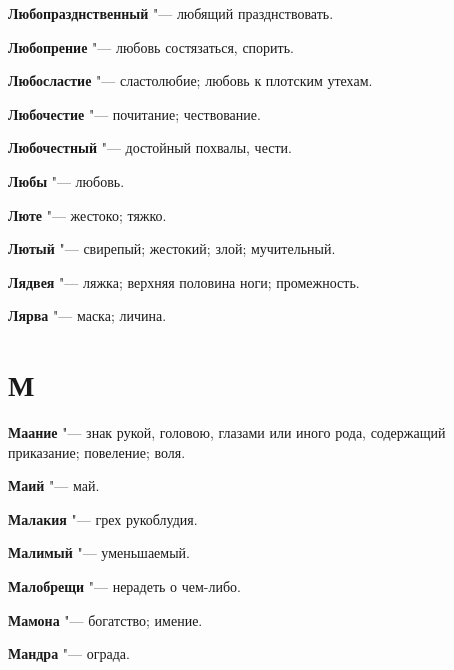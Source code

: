 \begin{mymulticols}{2}
\noindent\textbf{Любопразднственный} "--- любящий празднствовать. 




\noindent\textbf{Любопрение} "--- любовь состязаться, спорить. 




\noindent\textbf{Любосластие} "--- сластолюбие; любовь к плотским утехам. 




\noindent\textbf{Любочестие} "--- почитание; чествование. 




\noindent\textbf{Любочестный} "--- достойный похвалы, чести. 




\noindent\textbf{Любы} "--- любовь. 




\noindent\textbf{Люте} "--- жестоко; тяжко. 




\noindent\textbf{Лютый} "--- свирепый; жестокий; злой; мучительный. 




\noindent\textbf{Лядвея} "--- ляжка; верхняя половина ноги; промежность. 




\noindent\textbf{Лярва} "--- маска; личина. 




\section{М}





\noindent\textbf{Маание} "--- знак рукой, головою, глазами или иного рода, содержащий приказание; повеление; воля. 




\noindent\textbf{Маий} "--- май. 




\noindent\textbf{Малакия} "--- грех рукоблудия. 




\noindent\textbf{Малимый} "--- уменьшаемый. 




\noindent\textbf{Малобрещи} "--- нерадеть о чем-либо. 




\noindent\textbf{Мамона} "--- богатство; имение. 




\noindent\textbf{Мандра} "--- ограда. 





\end{mymulticols}
